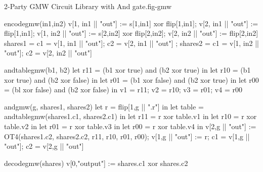 \begin{fpfig}[t]{2-Party GMW Circuit Library with And gate.}{fig-gmw}
{\footnotesize
  \begin{verbatimtab}
    encodegmw(in1,in2) {
      v[1, in1 || "out"] := s[1,in1] xor flip[1,in1];
      v[2, in1 || "out"] := flip[1,in1];
      v[1, in2 || "out"] := s[2,in2] xor flip[2,in2];
      v[2, in2 || "out"] := flip[2,in2]
      { shares1 = { c1 = v[1, in1 || "out"]; c2 = v[2, in1 || "out"] };
        shares2 = { c1 = v[1, in2 || "out"]; c2 = v[2, in2 || "out"]} } 
    }
    
    andtablegmw(b1, b2) {
      let r11 = (b1 xor true) and (b2 xor true) in
      let r10 = (b1 xor true) and (b2 xor false) in
      let r01 = (b1 xor false) and (b2 xor true) in
      let r00 = (bl xor false) and (b2 xor false) in
      { v1 = r11; v2 = r10; v3 = r01; v4 = r00 }
    }
    
    andgmw(g, shares1, shares2) {
      let r = flip[1,g || ".r"] in
      let table = andtablegmw(shares1.c1, shares2.c1) in
      let r11 =  r xor table.v1 in
      let r10 =  r xor table.v2 in
      let r01 =  r xor table.v3 in
      let r00 =  r xor table.v4 in
      v[2,g || "out"] := OT4(shares1.c2, shares2.c2, r11, r10, r01, r00);
      v[1,g || "out"] := r;
      { c1 = v[1,g || "out"]; c2 = v[2,g || "out"]}
    }
    
    decodegmw(shares) { v[0,"output"] := shares.c1 xor shares.c2 }
  \end{verbatimtab}
}
\end{fpfig}
